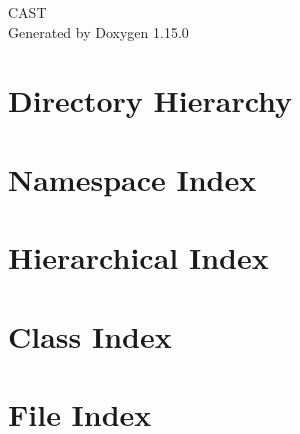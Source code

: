 \documentclass[twoside]{book}
\newcommand{\+}{\discretionary{\mbox{\scriptsize$\hookleftarrow$}}{}{}}
\newcommand{\clearemptydoublepage}{%
    \newpage{\pagestyle{empty}\cleardoublepage}%
  }
\begin{document}
  \raggedbottom
    \hypersetup{pageanchor=false,
                bookmarksnumbered=true,
                pdfencoding=unicode
               }
  \begin{titlepage}
  \vspace*{7cm}
  \begin{center}%
  {\Large CAST}\\
  \vspace*{1cm}
  {\large Generated by Doxygen 1.15.0}\\
  \end{center}
  \end{titlepage}
  \clearemptydoublepage
  \tableofcontents
  \clearemptydoublepage
  \hypersetup{pageanchor=true}







\chapter{Directory Hierarchy}

\chapter{Namespace Index}

\chapter{Hierarchical Index}

\chapter{Class Index}

\chapter{File Index}

\end{document}
